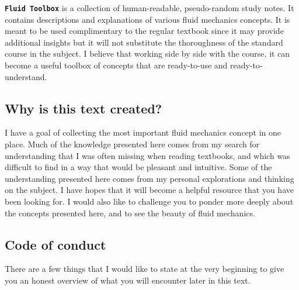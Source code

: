 \documentclass[10pt]{report}
\begin{document}


\texttt{\textbf{Fluid Toolbox}} is a collection of human-readable, pseudo-random study notes. It contains descriptions and explanations of various fluid mechanics concepts. It is meant to be used complimentary to the regular textbook since it may provide additional insights but it will not substitute the thoroughness of the standard course in the subject. I believe that working side by side with the course, it can become a useful toolbox of concepts that are ready-to-use and ready-to-understand.

\subsection*{Why is this text created?}

I have a goal of collecting the most important fluid mechanics concept in one place. Much of the knowledge presented here comes from my search for understanding that I was often missing when reading textbooks, and which was difficult to find in a way that would be pleasant and intuitive. Some of the understanding presented here comes from my personal explorations and thinking on the subject. I have hopes that it will become a helpful resource that you have been looking for. I would also like to challenge you to ponder more deeply about the concepts presented here, and to see the beauty of fluid mechanics.

\subsection*{Code of conduct}
\thispagestyle{empty}
There are a few things that I would like to state at the very beginning to give you an honest overview of what you will encounter later in this text.
\end{document}
